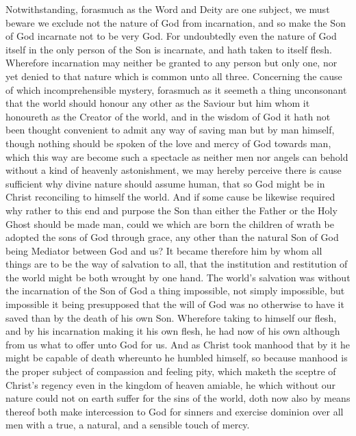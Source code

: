 Notwithstanding, forasmuch as the Word and Deity are one subject, we must beware we exclude not the nature of God from incarnation, and so make the Son of God incarnate not to be very God. For undoubtedly even the nature of God itself in the only person of the Son is incarnate, and hath taken to itself flesh. Wherefore incarnation may neither be granted to any person but only one, nor yet denied to that nature which is common unto all three.
Concerning the cause of which incomprehensible mystery, forasmuch as it seemeth a thing unconsonant that the world should honour any other as the Saviour but him whom it honoureth as the Creator of the world, and in the wisdom of God it hath not been thought convenient to admit any way of  saving man but by man himself, though nothing should be spoken of the love and mercy of God towards man, which this way are become such a spectacle as neither men nor angels can behold without a kind of heavenly astonishment, we may hereby perceive there is cause sufficient why divine nature should assume human, that so God might be in Christ reconciling to himself the world. And if some cause be likewise required why rather to this end and purpose the Son than either the Father or the Holy Ghost should be made man, could we which are born the children of wrath be adopted the sons of God through grace, any other than the natural Son of God being Mediator between God and us? It became therefore him by whom all things are to be the way of salvation to all, that the institution and restitution of the world might be both wrought by one hand. The world’s salvation was without the incarnation of the Son of God a thing impossible, not simply impossible, but impossible it being presupposed that the will of God was no otherwise to have it saved than by the death of his own Son. Wherefore taking to himself our flesh, and by his incarnation making it his own flesh, he had now of his own although from us what to offer unto God for us.
And as Christ took manhood that by it he might be capable of death whereunto he humbled himself, so because manhood is the proper subject of compassion and feeling pity, which maketh the sceptre of Christ’s regency even in the kingdom of heaven amiable, he which without our nature could not on earth suffer for the sins of the world, doth now also by means thereof both make intercession to God for sinners and exercise dominion over all men with a true, a natural, and a sensible touch of mercy.

